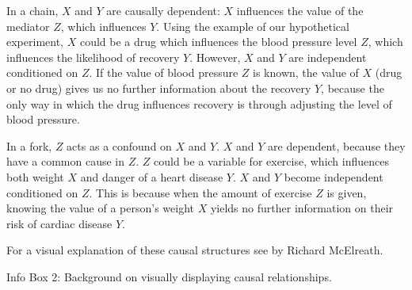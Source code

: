 \documentclass[nobib]{tufte-handout}
\begin{document}
\begin{InfoBox}
{\begin{minipage}{1\textwidth}
\begin{center}
    \end{center}

    \vspace{-1.25cm}
    In a chain, $X$ and $Y$ are causally dependent: $X$ influences the value of the mediator $Z$, which influences $Y$.
    Using the example of our hypothetical experiment, $X$ could be a drug which influences the blood pressure level $Z$, which influences the likelihood of recovery $Y$.
    However, $X$ and $Y$ are independent conditioned on $Z$.
    If the value of blood pressure $Z$ is known, the value of $X$ (drug or no drug) gives us no further information about the recovery $Y$, because the only way in which the drug influences recovery is through adjusting the level of blood pressure.

    In a fork, $Z$ acts as a confound on $X$ and $Y$.
    $X$ and $Y$ are dependent, because they have a common cause in $Z$.
    $Z$ could be a variable for exercise, which influences both weight $X$ and danger of a heart disease $Y$.
    $X$ and $Y$ become independent conditioned on $Z$.
    This is because when the amount of exercise $Z$ is given, knowing the value of a person's weight $X$ yields no further information on their risk of cardiac disease $Y$.

    For a visual explanation of these causal structures see  \href{https://youtu.be/mBEA7PKDmiY?si=Ihio7ZXJSuct4J30}{{\color{Red}{this lecture}}} by Richard McElreath.
    \medskip
  \end{minipage}
}
\begin{center}
Info Box 2: Background on visually displaying causal relationships.
\end{center}
\end{InfoBox}
\end{document}
